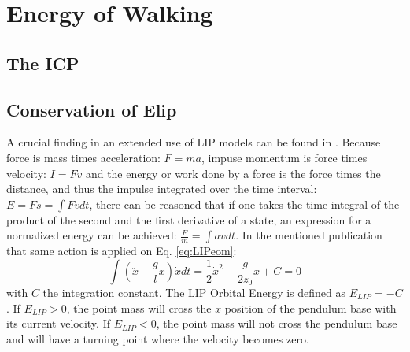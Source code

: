 \section{Energy of Walking}
\subsection{The \ac{ICP}} 
\subsection{Conservation of \ac{Elip}}
A crucial finding in an extended use of \ac{LIP} models can be found in \cite{kajita1992dynamic}. Because force is mass times acceleration: $F=ma$, impuse momentum is force times velocity: $I=Fv$ and the energy or work done by a force is the force times the distance, and thus the impulse integrated over the time interval: $E = Fs = \int Fv dt$, there can be reasoned that if one takes the time integral of the product of the second and the first derivative of a state, an expression for a normalized energy can be achieved: $\frac{E}{m}=\int av dt$. In the mentioned publication that same action is applied on Eq. \eqref{eq:LIPeom}:
\begin{equation}
\int (\ddot{x}-\frac{g}{l}x)\dot{x} dt = \frac{1}{2}\dot{x}^2-\frac{g}{2z_0}x +C=0
\label{eq:Elip}
\end{equation}
with $C$ the integration constant. The \ac{LIP} Orbital Energy is defined as $E_{LIP}=-C$. If $E_{LIP}>0$, the point mass will cross the $x$ position of the pendulum base with its current velocity. If $E_{LIP}<0$, the point mass will not cross the pendulum base and will have a turning point where the velocity becomes zero.

